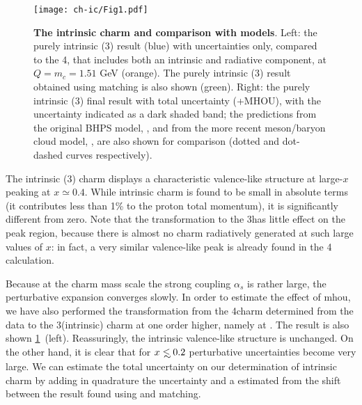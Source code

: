 \begin{figure}[h]
  \centering
  \texttt{[image: ch-ic/Fig1.pdf]}
  \caption{\small
    \textbf{ The intrinsic charm \pdf and comparison with models}.
%
    Left: the purely intrinsic (3\fns) result (blue) with \pdf uncertainties
    only, compared to the 4\fns \pdf, that includes both an intrinsic and
    radiative component, at $Q=m_c=1.51$ GeV (orange).
    The purely intrinsic (3\fns) result obtained using \nnnlo matching is
    also shown (green).
    Right: the purely intrinsic (3\fns) final result with total uncertainty
    (\pdf+MHOU), with the \pdf uncertainty indicated as a dark shaded band; the
    predictions from the original BHPS model, \cite{Brodsky:1980pb}, and from
    the more recent meson/baryon cloud model, \cite{Hobbs:2013bia}, are also
    shown for comparison (dotted and dot-dashed curves respectively).
  }
  \label{fig:ic/charm_content_3fns} 
\end{figure}

The intrinsic (3\fns) charm \pdf displays a characteristic valence-like
structure at large-$x$ peaking at $x\simeq 0.4$.
%
While intrinsic charm is found to be small in absolute terms (it contributes
less than 1\% to the proton  total momentum), it is significantly different
from zero.
%
Note that the transformation to the 3\fns has little effect on the peak region,
because there is almost no charm radiatively generated at such large values of
$x$: in fact, a very similar valence-like peak is already found in the 4\fns
calculation.

Because at the charm mass scale the strong coupling $\alpha_s$ is rather large,
the perturbative expansion converges slowly.
%
In order to estimate the effect of \acrfull{mhou}, we have also performed the
transformation from the 4\fns \nnlo charm \pdf determined from the data to the
3\fns (intrinsic) charm \pdf at one order higher, namely at \nnnlo. 
%
The result is also shown \cref{fig:ic/charm_content_3fns}~(left).
Reassuringly, the intrinsic valence-like structure is unchanged.
%
On the other hand, it is clear that for $x\lsim 0.2$ perturbative uncertainties
become very large.
%
We can estimate  the total uncertainty on our determination of intrinsic charm
by adding in quadrature the \pdf uncertainty and a \mhou estimated from the
shift between the result found using \nnlo and \nnnlo matching.

